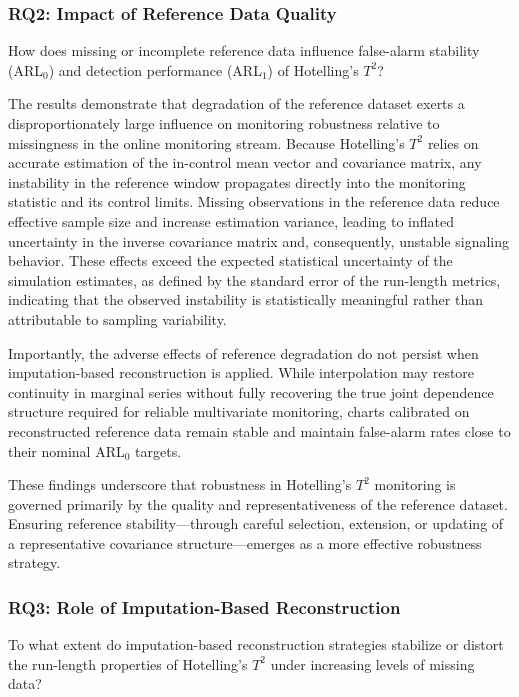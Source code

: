 \subsubsection{RQ2: Impact of Reference Data Quality}

How does missing or incomplete reference data influence false-alarm stability (\ac{ARL}$_0$) and detection performance (\ac{ARL}$_1$) of Hotelling’s $T^2$?

The results demonstrate that degradation of the reference dataset exerts a disproportionately large influence on monitoring robustness relative to missingness in the online monitoring stream. Because Hotelling’s $T^2$ relies on accurate estimation of the in-control mean vector and covariance matrix, any instability in the reference window propagates directly into the monitoring statistic and its control limits. Missing observations in the reference data reduce effective sample size and increase estimation variance, leading to inflated uncertainty in the inverse covariance matrix and, consequently, unstable signaling behavior. These effects exceed the expected statistical uncertainty of the simulation estimates, as defined by the standard error of the run-length metrics, indicating that the observed instability is statistically meaningful rather than attributable to sampling variability.


Importantly, the adverse effects of reference degradation do not persist when imputation-based reconstruction is applied. While interpolation may restore continuity in marginal series without fully recovering the true joint dependence structure required for reliable multivariate monitoring, charts calibrated on reconstructed reference data remain stable and maintain false-alarm rates close to their nominal \ac{ARL}$_0$ targets.

These findings underscore that robustness in Hotelling’s $T^2$ monitoring is governed primarily by the quality and representativeness of the reference dataset. Ensuring reference stability—through careful selection, extension, or updating of a representative covariance structure—emerges as a more effective robustness strategy.

\subsubsection{RQ3: Role of Imputation-Based Reconstruction}

To what extent do imputation-based reconstruction strategies stabilize or distort the run-length properties of Hotelling’s $T^2$ under increasing levels of missing data?

